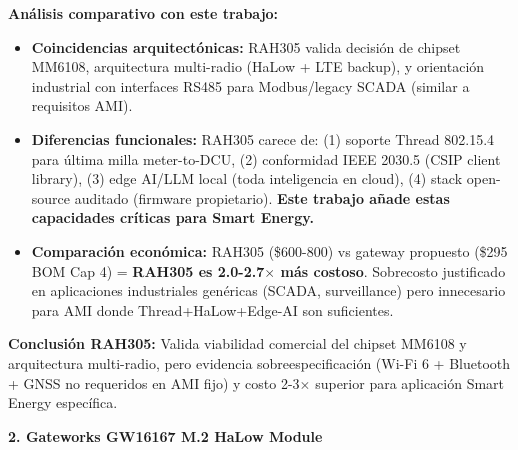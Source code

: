 \textbf{Análisis comparativo con este trabajo:}
\begin{itemize}
    \item \textbf{Coincidencias arquitectónicas:} RAH305 valida decisión de chipset MM6108, arquitectura multi-radio (HaLow + LTE backup), y orientación industrial con interfaces RS485 para Modbus/legacy SCADA (similar a requisitos AMI).
    \item \textbf{Diferencias funcionales:} RAH305 carece de: (1) soporte Thread 802.15.4 para última milla meter-to-DCU, (2) conformidad IEEE 2030.5 (CSIP client library), (3) edge AI/LLM local (toda inteligencia en cloud), (4) stack open-source auditado (firmware propietario). \textbf{Este trabajo añade estas capacidades críticas para Smart Energy.}
    \item \textbf{Comparación económica:} RAH305 (\$600-800) vs gateway propuesto (\$295 BOM Cap 4) = \textbf{RAH305 es 2.0-2.7$\times$ más costoso}. Sobrecosto justificado en aplicaciones industriales genéricas (SCADA, surveillance) pero innecesario para AMI donde Thread+HaLow+Edge-AI son suficientes.
\end{itemize}

\textbf{Conclusión RAH305:} Valida viabilidad comercial del chipset MM6108 y arquitectura multi-radio, pero evidencia sobreespecificación (Wi-Fi 6 + Bluetooth + GNSS no requeridos en AMI fijo) y costo 2-3$\times$ superior para aplicación Smart Energy específica.

\textbf{2. Gateworks GW16167 M.2 HaLow Module}~\cite{gateworksGW16167HaLow2025}

